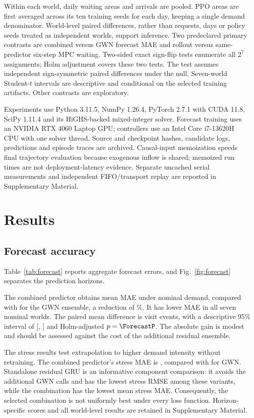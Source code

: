 Within each world, daily waiting areas and arrivals are pooled. PPO areas are first averaged across its ten training seeds for each day, keeping a single demand denominator. World-level paired differences, rather than requests, days or policy seeds treated as independent worlds, support inference. Two predeclared primary contrasts are combined versus GWN forecast MAE and rollout versus same-predictor six-step MPC waiting. Two-sided exact sign-flip tests enumerate all $2^7$ assignments; Holm adjustment covers these two tests. The test assumes independent sign-symmetric paired differences under the null. Seven-world Student-$t$ intervals are descriptive and conditional on the selected training artifacts. Other contrasts are exploratory.

Experiments use Python 3.11.5, NumPy 1.26.4, PyTorch 2.7.1 with CUDA 11.8, SciPy 1.11.4 and its HiGHS-backed mixed-integer solver. Forecast training uses an NVIDIA RTX 4060 Laptop GPU; controllers use an Intel Core i7-13620H CPU with one solver thread. Source and checkpoint hashes, candidate logs, predictions and episode traces are archived. Causal-input memoization speeds final trajectory evaluation because exogenous inflow is shared; memoized run times are not deployment-latency evidence. Separate uncached serial measurements and independent FIFO/transport replay are reported in Supplementary Material.

\section{Results}
\subsection{Forecast accuracy}
Table~\ref{tab:forecast} reports aggregate forecast errors, and Fig.~\ref{fig:forecast} separates the prediction horizons.



The combined predictor obtains mean MAE \ForecastNominal{} under nominal demand, compared with \ForecastGWN{} for the GWN ensemble, a reduction of \ForecastGain\%. It has lower MAE in all seven nominal worlds. The paired mean difference is \ForecastDifference{} visit events, with a descriptive 95\% interval of [\ForecastLow{}, \ForecastHigh{}] and Holm-adjusted $p=\ForecastP$. The absolute gain is modest and should be assessed against the cost of the additional residual ensemble.


The stress results test extrapolation to higher demand intensity without retraining. The combined predictor's stress MAE is \ForecastSurge{}, compared with \ForecastGWNSurge{} for GWN. Standalone residual GRU is an informative component comparison: it avoids the additional GWN calls and has the lowest stress RMSE among these variants, while the combination has the lowest mean stress MAE. Consequently, the selected combination is not uniformly best under every loss function. Horizon-specific scores and all world-level results are retained in Supplementary Material.
\FloatBarrier

